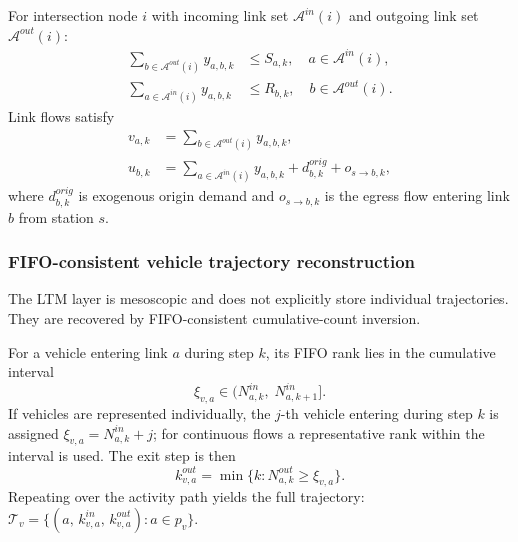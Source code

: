 For intersection node $i$ with incoming link set $\mathcal{A}^{in}(i)$
and outgoing link set $\mathcal{A}^{out}(i)$:
\begin{align}
  \sum_{b \in \mathcal{A}^{out}(i)} y_{a,b,k} &\le S_{a,k},
    \quad a \in \mathcal{A}^{in}(i),
    \label{eq:node-send}\\
  \sum_{a \in \mathcal{A}^{in}(i)} y_{a,b,k} &\le R_{b,k},
    \quad b \in \mathcal{A}^{out}(i).
    \label{eq:node-recv}
\end{align}
Link flows satisfy
\begin{align}
  v_{a,k} &= \sum_{b \in \mathcal{A}^{out}(i)} y_{a,b,k}, \\
  u_{b,k} &= \sum_{a \in \mathcal{A}^{in}(i)} y_{a,b,k}
              + d^{orig}_{b,k}
              + o_{s\to b,k},
  \label{eq:node-entry}
\end{align}
where $d^{orig}_{b,k}$ is exogenous origin demand and
$o_{s\to b,k}$ is the egress flow entering link $b$ from station $s$.

\subsubsection{FIFO-consistent vehicle trajectory reconstruction}
\label{sec:traffic-fifo-reconstruction}

The LTM layer is mesoscopic and does not explicitly store individual
trajectories.  They are recovered by FIFO-consistent cumulative-count
inversion.

For a vehicle entering link $a$ during step $k$, its FIFO rank lies in
the cumulative interval
\begin{equation}
  \xi_{v,a} \in \bigl(N^{in}_{a,k},\; N^{in}_{a,k+1}\bigr].
\end{equation}
If vehicles are represented individually, the $j$-th vehicle entering
during step $k$ is assigned $\xi_{v,a} = N^{in}_{a,k} + j$; for
continuous flows a representative rank within the interval is used.
The exit step is then
\begin{equation}
  k^{out}_{v,a}
  = \min\!\bigl\{k : N^{out}_{a,k} \ge \xi_{v,a}\bigr\}.
  \label{eq:fifo-exit}
\end{equation}
Repeating over the activity path yields the full trajectory:
$\mathcal{T}_v = \{(a,\, k^{in}_{v,a},\, k^{out}_{v,a}) : a \in p_v\}$.

